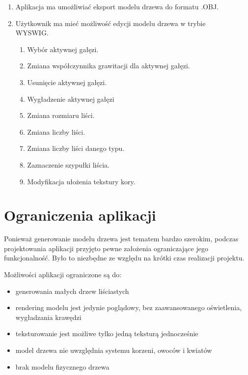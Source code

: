 \begin{enumerate}
\item Aplikacja ma umożliwiać eksport modelu drzewa do formatu .OBJ.
\item Użytkownik ma mieć możliwość edycji modelu drzewa w trybie \\WYSWIG.
\begin{enumerate}
\item Wybór aktywnej gałęzi.
\item Zmiana współczynnika grawitacji dla aktywnej gałęzi.
\item Usunięcie aktywnej gałęzi.
\item Wygładzenie aktywnej gałęzi
\item Zmiana rozmiaru liści.
\item Zmiana liczby liści.
\item Zmiana liczby liści danego typu.
\item Zaznaczenie szypułki liścia.
\item Modyfikacja ułożenia tekstury kory.
\end{enumerate}
\end{enumerate}

\section{Ograniczenia aplikacji}
Ponieważ generowanie modelu drzewa jest tematem bardzo szerokim, podczas projektowania
aplikacji przyjęto pewne założenia ograniczające jego funkcjonalność. Było to niezbędne ze
względu na krótki czas realizacji projektu.

Możliwości aplikacji ograniczone są do:
\begin{itemize}
	\item {generowania małych drzew liściastych}
	\item {rendering modelu jest jedynie poglądowy, bez zaawansowanego oświetlenia, wygładzania krawędzi}
	\item {teksturowanie jest możliwe tylko jedną teksturą jednocześnie}
	\item {model drzewa nie uwzględnia systemu korzeni, owoców i kwiatów}
	\item {brak modelu fizycznego drzewa}
\end{itemize}
